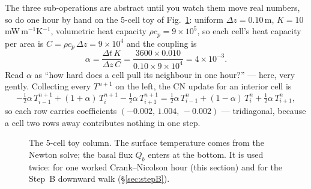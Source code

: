 \documentclass[11pt]{report}
\begin{document}
The three sub-operations are abstract until you watch them move real numbers, so
do one hour by hand on the 5-cell toy of Fig.~\ref{fig:toy}: uniform
$\Delta z=0.10$\,m, $K=10$\,mW\,m$^{-1}$K$^{-1}$, volumetric heat capacity
$\rho c_p=9\!\times\!10^{5}$, so each cell's heat capacity per area is
$C=\rho c_p\,\Delta z=9\!\times\!10^{4}$ and the coupling is
\[
\alpha=\frac{\Delta t\,K}{\Delta z\,C}=\frac{3600\times0.010}{0.10\times9\!\times\!10^{4}}=4\!\times\!10^{-3}.
\]
Read $\alpha$ as ``how hard does a cell pull its neighbour in one hour?'' --- here,
very gently. Collecting every $T^{n+1}$ on the left, the CN update for an interior
cell is
\[
-\tfrac12\alpha\,T_{i-1}^{n+1}+(1+\alpha)\,T_i^{n+1}-\tfrac12\alpha\,T_{i+1}^{n+1}
=\tfrac12\alpha\,T_{i-1}^{n}+(1-\alpha)\,T_i^{n}+\tfrac12\alpha\,T_{i+1}^{n},
\]
so each row carries coefficients $(-0.002,\,1.004,\,-0.002)$ --- tridiagonal,
because a cell two rows away contributes nothing in one step.

\begin{figure}[htbp]\centering

\caption{The 5-cell toy column. The surface temperature comes from the Newton
solve; the basal flux $Q_b$ enters at the bottom. It is used twice: for one
worked Crank--Nicolson hour (this section) and for the Step~B downward walk
(\S\ref{sec:stepB}).}
\label{fig:toy}
\end{figure}
\end{document}

